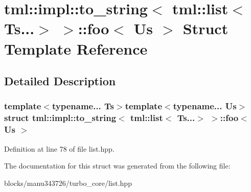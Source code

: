 \hypertarget{structtml_1_1impl_1_1to__string_3_01tml_1_1list_3_01_ts_8_8_8_4_01_4_1_1foo}{\section{tml\+:\+:impl\+:\+:to\+\_\+string$<$ tml\+:\+:list$<$ Ts...$>$ $>$\+:\+:foo$<$ Us $>$ Struct Template Reference}
\label{structtml_1_1impl_1_1to__string_3_01tml_1_1list_3_01_ts_8_8_8_4_01_4_1_1foo}
}


\subsection{Detailed Description}
\subsubsection*{template$<$typename... Ts$>$template$<$typename... Us$>$struct tml\+::impl\+::to\+\_\+string$<$ tml\+::list$<$ Ts...$>$ $>$\+::foo$<$ Us $>$}



Definition at line 78 of file list.\+hpp.



The documentation for this struct was generated from the following file\+:\begin{DoxyCompactItemize}
\item 
blocks/manu343726/turbo\+\_\+core/list.\+hpp\end{DoxyCompactItemize}
